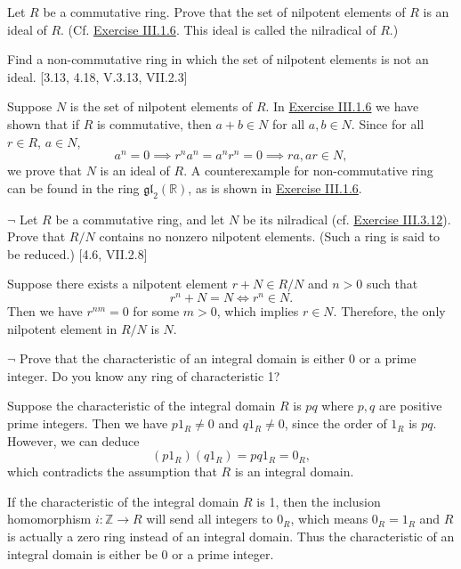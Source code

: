 \documentclass[12pt,letterpaper,boxed]{hmcpset}
\newcommand{\Z}{\mathbb{Z}}
\begin{document}
\hypertarget{Exercise III.3.12}{}
\begin{problem}[3.12]
Let $R$ be a commutative ring. Prove that the set of nilpotent elements of $R$ is an ideal of $R$. (Cf. \hyperlink{Exercise III.1.6}{Exercise III.1.6}. This ideal is called the nilradical of $R$.)

Find a non-commutative ring in which the set of nilpotent elements is not an ideal. [3.13, 4.18, V.3.13, \textsection VII.2.3]
\end{problem}
\begin{solution}
Suppose $N$ is the set of nilpotent elements of $R$. In \hyperlink{Exercise III.1.6}{Exercise III.1.6} we have shown that if $R$ is commutative, then $a+b\in N$ for all $a,b\in N$. Since for all $r\in R$, $a\in N$,
\[
a^n=0\implies r^na^n=a^nr^n=0\implies ra,ar\in N,
\]
we prove that $N$ is an ideal of $R$. A counterexample for non-commutative ring can be found in the ring $\mathfrak{gl}_2(\mathbb{R})$, as is shown in \hyperlink{Exercise III.1.6}{Exercise III.1.6}.
\end{solution}

\hypertarget{Exercise III.3.13}{}
\begin{problem}[3.13]
$\neg$ Let $R$ be a commutative ring, and let $N$ be its nilradical (cf. \hyperlink{Exercise III.3.12}{Exercise III.3.12}). Prove that $R/N$ contains no nonzero nilpotent elements. (Such a ring is said to be reduced.) [4.6, VII.2.8]
\end{problem}
\begin{solution}
Suppose there exists a nilpotent element $r+N\in R/N$ and $n>0$ such that
\[
r^n+N=N\iff r^n\in N.
\]
Then we have $r^{nm}=0$ for some $m>0$, which implies $r\in N$. Therefore, the only nilpotent element in $R/N$ is $N$. 
\end{solution}

\begin{problem}[3.14]
$\neg$ Prove that the characteristic of an integral domain is either 0 or a prime
integer. Do you know any ring of characteristic 1?
\end{problem}
\begin{solution}
Suppose the characteristic of the integral domain $R$ is $pq$ where $p,q$ are positive prime integers. Then we have $p1_R\ne 0$ and $q1_R\ne0$, since the order of $1_R$ is $pq$. However, we can deduce
\[
(p1_R)(q1_R)=pq1_R=0_R,
\]
which contradicts the assumption that $R$ is an integral domain. 

If the characteristic of the integral domain $R$ is 1, then the inclusion homomorphism $i:\Z\to R$ will send all integers to $0_R$, which means $0_R=1_R$ and $R$ is actually a zero ring instead of an integral domain. Thus the characteristic of an integral domain is either be 0 or a prime integer.
\end{solution}
\end{document}

